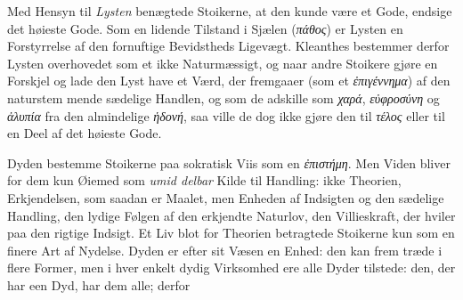 \documentclass[12pt,a4paper]{book}
\newcommand{\gk}[1]{\textit{#1}}
\begin{document}
Med Hensyn til \emph{Lysten} benægtede Stoikerne, at den
kunde være et Gode, endsige det høieste Gode. Som en
lidende Tilstand i Sjælen (\gk{πάθος}) er Lysten en Forstyrrelse
af den fornuftige Bevidstheds Ligevægt. Kleanthes bestemmer
derfor Lysten overhovedet som et ikke Naturmæssigt, og naar
andre Stoikere gjøre en Forskjel og lade den Lyst have et
Værd, der fremgaaer (som et \gk{ἐπιγέννημα}) af den naturstem\-%
mende sædelige Handlen, og som de adskille som \gk{χαρά},
\gk{εὐφροσύνη} og \gk{ἀλυπία} fra den almindelige \gk{ἡδονή}, saa ville de
dog ikke gjøre den til \gk{τέλος} eller til en Deel af det høieste
Gode.

Dyden bestemme Stoikerne paa sokratisk Viis som en
\gk{ἐπιστήμη}. Men Viden bliver for dem kun Øiemed som \emph{umid\-%
delbar} Kilde til Handling: ikke Theorien, Erkjendelsen, som
saadan er Maalet, men Enheden af Indsigten og den sædelige
Handling, den lydige Følgen af den erkjendte Naturlov, den
Villieskraft, der hviler paa den rigtige Indsigt. Et Liv blot
for Theorien betragtede Stoikerne kun som en finere Art af
Nydelse. Dyden er efter sit Væsen en Enhed: den kan frem\-%
træde i flere Former, men i hver enkelt dydig Virksomhed ere
alle Dyder tilstede: den, der har een Dyd, har dem alle; derfor
\end{document}
